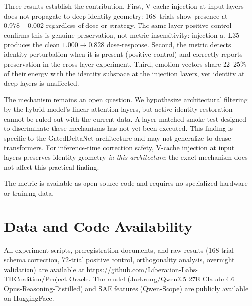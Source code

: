 \documentclass[11pt,a4paper]{article}
\begin{document}
Three results establish the contribution. First, V-cache injection at
input layers does not propagate to deep identity geometry: 168~trials
show presence at $0.978 \pm 0.002$ regardless of dose or strategy.
The same-layer positive control confirms this is genuine preservation,
not metric insensitivity: injection at L35 produces the clean
$1.000 \to 0.828$ dose-response. Second, the metric detects identity
perturbation when it is present (positive control) and correctly reports
preservation in the cross-layer experiment. Third, emotion vectors
share 22--25\% of their energy with the identity subspace at the
injection layers, yet identity at deep layers is unaffected.

The mechanism remains an open question. We hypothesize architectural
filtering by the hybrid model's linear-attention layers, but active
identity restoration cannot be ruled out with the current data. A
layer-matched smoke test designed to discriminate these mechanisms has
not yet been executed. This finding is specific to the GatedDeltaNet
architecture and may not generalize to dense transformers. For
inference-time correction safety, V-cache injection at input layers
preserves identity geometry \emph{in this architecture}; the exact
mechanism does not affect this practical finding.

The metric is available as open-source code and requires no specialized
hardware or training data.

\section*{Data and Code Availability}

All experiment scripts, preregistration documents, and raw results
(168-trial schema correction, 72-trial positive control, orthogonality
analysis, overnight validation) are available at
\url{https://github.com/Liberation-Labs-THCoalition/Project-Oracle}.
The model (Jackrong/Qwen3.5-27B-Claude-4.6-Opus-Reasoning-Distilled) and
SAE features (Qwen-Scope) are publicly available on HuggingFace.



\end{document}
